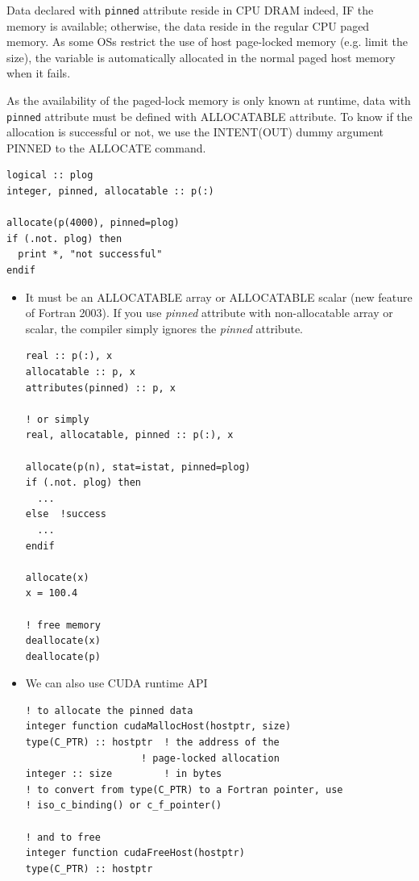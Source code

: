 Data declared with \verb!pinned! attribute
reside in CPU DRAM indeed, IF the memory is available; otherwise, the
data reside in the regular CPU paged memory.  As some OSs restrict the
use of host page-locked memory (e.g. limit the size), the variable is
automatically allocated in the normal paged host memory when it fails.


As the availability of the paged-lock memory is only known at runtime,
data with \verb!pinned! attribute must be defined with ALLOCATABLE
attribute. To know if the allocation is successful or not, we use the
INTENT(OUT) dummy argument PINNED to the ALLOCATE command.
\begin{lstlisting}
logical :: plog
integer, pinned, allocatable :: p(:)

allocate(p(4000), pinned=plog)
if (.not. plog) then 
  print *, "not successful"
endif 

\end{lstlisting}

\begin{itemize}
\item It must be an ALLOCATABLE array or ALLOCATABLE scalar (new
  feature of Fortran 2003). If you use {\it pinned} attribute with
  non-allocatable array or scalar, the compiler simply ignores the
  {\it pinned} attribute.
\begin{lstlisting}
real :: p(:), x
allocatable :: p, x
attributes(pinned) :: p, x

! or simply
real, allocatable, pinned :: p(:), x

allocate(p(n), stat=istat, pinned=plog)
if (.not. plog) then
  ...
else  !success
  ...
endif

allocate(x)
x = 100.4

! free memory
deallocate(x)
deallocate(p)
\end{lstlisting}

\item We can also use CUDA runtime API
\begin{lstlisting}
! to allocate the pinned data
integer function cudaMallocHost(hostptr, size)
type(C_PTR) :: hostptr  ! the address of the 
                    ! page-locked allocation
integer :: size         ! in bytes
! to convert from type(C_PTR) to a Fortran pointer, use 
! iso_c_binding() or c_f_pointer()

! and to free
integer function cudaFreeHost(hostptr)
type(C_PTR) :: hostptr
\end{lstlisting}

\end{itemize}

